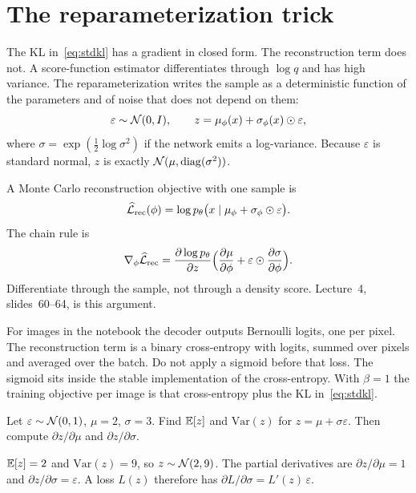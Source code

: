\section{The reparameterization trick}

The KL in~\eqref{eq:stdkl} has a gradient in closed form. The reconstruction term does not. A score-function estimator differentiates through $\log q$ and has high variance. The reparameterization writes the sample as a deterministic function of the parameters and of noise that does not depend on them:
\[
\varepsilon\sim\mathcal{N}(0,I),\qquad
z=\mu_\phi(x)+\sigma_\phi(x)\odot\varepsilon,
\]
where $\sigma=\exp(\tfrac12\log\sigma^2)$ if the network emits a log-variance. Because $\varepsilon$ is standard normal, $z$ is exactly $\mathcal{N}(\mu,\operatorname{diag}(\sigma^2))$.

A Monte Carlo reconstruction objective with one sample is
\[
\widehat{\mathcal L}_{\mathrm{rec}}(\phi)
=\log p_\theta\bigl(x\mid \mu_\phi+\sigma_\phi\odot\varepsilon\bigr).
\]
The chain rule is
\[
\nabla_\phi \widehat{\mathcal L}_{\mathrm{rec}}
=\frac{\partial\log p_\theta}{\partial z}
\Bigl(
\frac{\partial\mu}{\partial\phi}
+\varepsilon\odot\frac{\partial\sigma}{\partial\phi}
\Bigr).
\]
Differentiate through the sample, not through a density score. Lecture~4, slides~60--64, is this argument.

\begin{center}
\end{center}

For images in the notebook the decoder outputs Bernoulli logits, one per pixel. The reconstruction term is a binary cross-entropy with logits, summed over pixels and averaged over the batch. Do not apply a sigmoid before that loss. The sigmoid sits inside the stable implementation of the cross-entropy. With $\beta=1$ the training objective per image is that cross-entropy plus the KL in~\eqref{eq:stdkl}.

\begin{practbox}
Let $\varepsilon\sim\mathcal{N}(0,1)$, $\mu=2$, $\sigma=3$. Find $\mathbb{E}[z]$ and $\mathrm{Var}(z)$ for $z=\mu+\sigma\varepsilon$. Then compute $\partial z/\partial\mu$ and $\partial z/\partial\sigma$.
\end{practbox}
\begin{solbox}
$\mathbb{E}[z]=2$ and $\mathrm{Var}(z)=9$, so $z\sim\mathcal{N}(2,9)$. The partial derivatives are $\partial z/\partial\mu=1$ and $\partial z/\partial\sigma=\varepsilon$. A loss $L(z)$ therefore has $\partial L/\partial\sigma=L'(z)\,\varepsilon$.
\end{solbox}

